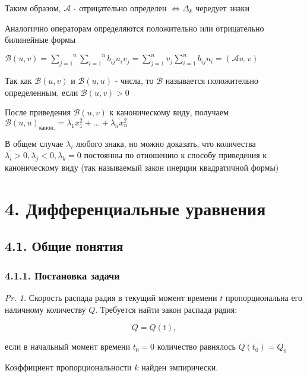 \documentclass[12pt]{article}
\begin{document}
    Таким образом, $\mathcal{A}$ - отрицательно определен $\Longleftrightarrow \Delta_k$ чередует знаки

    \Nota Аналогично операторам определяются положительно или отрицательно билинейные формы

    $\mathcal{B}(u, v) = \overset{n}{\underset{j = 1}{\sum}}\overset{n}{\underset{i = 1}{\sum}} b_{ij} u_i v_j = \sum_{j = 1}^n v_j \sum_{i = 1}^n b_{ij} u_i = (\mathcal{A} u, v)$

    Так как $\mathcal{B}(u, v)$ и  $\mathcal{B}(u, u)$ - числа, то $\mathcal{B}$ называется положительно определенным, если $\mathcal{B}(u, v) > 0$

    \Nota После приведения $\mathcal{B}(u, v)$ к каноническому виду, получаем $\mathcal{B}(u, u)_{\text{канон.}} = \lambda_1 x_1^2 + \dots + \lambda_n x_n^2$

    В общем случае $\lambda_i$ любого знака, но можно доказать, что количества $\lambda_i > 0, \lambda_j < 0, \lambda_k = 0$ постоянны по отношению к способу приведения
    к каноническому виду (так называемый закон инерции квадратичной формы)


    \section{4. Дифференциальные уравнения}

    \subsection{4.1. Общие понятия}

    \subsubsection{4.1.1. Постановка задачи}

    \hypertarget{radiumproblem}{}

    \begin{tcolorbox}
        \textit{Pr. 1.} Скорость распада радия в текущий момент времени $t$ пропорциональна его наличному количеству $Q$. Требуется найти закон распада радия:

        \[Q = Q(t),\]

        если в начальный момент времени $t_0 = 0$ количество равнялось $Q(t_0) = Q_0$

        Коэффициент пропорциональности $k$ найден эмпирически.
    \end{tcolorbox}
\end{document}
